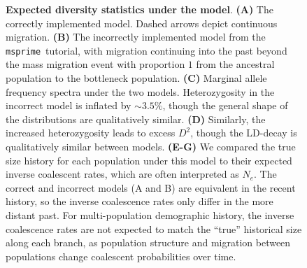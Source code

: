 \documentclass{article}
\newcommand{\msprime}[0]{\texttt{msprime}}
\begin{document}
\begin{figure}[ht]
\begin{center}
\caption{\textbf{Expected diversity statistics under the \citet{gutenkunst2009inferring} model}.
    \textbf{(A)} The correctly implemented model. Dashed arrows depict continuous migration.
    \textbf{(B)} The incorrectly implemented model from the \msprime\ tutorial, with migration continuing
    into the past beyond the mass migration event with proportion $1$ from the ancestral population
    to the bottleneck population.
    \textbf{(C)} Marginal allele frequency spectra under the two models. Heterozygosity in the incorrect model
    is inflated by $\sim3.5\%$, though the general shape of the distributions are qualitatively similar.
    \textbf{(D)} Similarly, the increased heterozygosity leads to excess $D^2$, though the LD-decay is
    qualitatively similar between models.
    \textbf{(E-G)} We compared the true size history for each population under this model to their
    expected inverse coalescent rates, which are often interpreted as $N_e$. The correct and incorrect
    models (A and B) are equivalent in the recent history, so the inverse coalescence rates only differ
    in the more distant past. For multi-population demographic history, the inverse coalescence rates
    are not expected to match the ``true'' historical size along each branch, as population structure and
    migration between populations change coalescent probabilities over time.
}
\label{fig:ooa_stats}
\end{center}
\end{figure}
\end{document}
